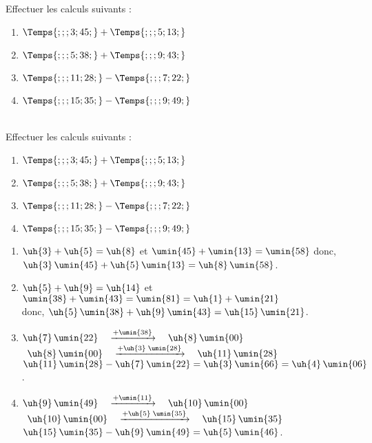 \begin{exercice}
    Effectuer les calculs suivants :
    \begin{enumerate}
       \item $\Temps{;;;3;45;} + \Temps{;;;5;13;}$
       \item $\Temps{;;;5;38;} + \Temps{;;;9;43;}$
       \item $\Temps{;;;11;28;} - \Temps{;;;7;22;}$
       \item $\Temps{;;;15;35;} - \Temps{;;;9;49;}$
    \end{enumerate}
 \end{exercice}
 
 \begin{corrige}
    \ \\ [-5mm]
    Effectuer les calculs suivants :

    \begin{enumerate}
       \item $\Temps{;;;3;45;} + \Temps{;;;5;13;}$
       \item $\Temps{;;;5;38;} + \Temps{;;;9;43;}$
       \item $\Temps{;;;11;28;} - \Temps{;;;7;22;}$
       \item $\Temps{;;;15;35;} - \Temps{;;;9;49;}$
    \end{enumerate}
    
    \smallskip
    {\red 
    \begin{enumerate}
       \item $\uh{3}+\uh{5} =\uh{8}$ et $\umin{45}+\umin{13} =\umin{58}$ donc, $\uh{3}\,\umin{45}+\uh{5}\,\umin{13} = \uh{8}\,\umin{58}$.
       \item $\uh{5}+\uh{9} =\uh{14}$ et \\
          $\umin{38}+\umin{43} =\umin{81} =\uh{1}+\umin{21}$ \\
          donc, $\uh{5}\,\umin{38}+\uh{9}\,\umin{43} = \uh{15}\,\umin{21}$.
       \item $\uh{7}\,\umin{22} \quad \xrightarrow{+\umin{38}} \quad \uh{8}\,\umin{00}$ \\
          \quad\, $\uh{8}\,\umin{00} \quad \xrightarrow{+\uh{3}\;  \umin{28}} \quad \uh{11}\,\umin{28}$ \\
          $\uh{11}\,\umin{28}-\uh{7}\,\umin{22} =\uh{3}\,\umin{66} = \uh{4}\,\umin{06}$.
       \item $\uh{9}\,\umin{49} \quad \xrightarrow{+\umin{11}} \quad \uh{10}\,\umin{00}$ \\
          \quad\, $\uh{10}\,\umin{00} \quad \xrightarrow{+\uh{5} \; \umin{35}} \quad \uh{15}\,\umin{35}$ \\   
          $\uh{15}\,\umin{35}-\uh{9}\,\umin{49} = \uh{5}\,\umin{46}$.
    \end{enumerate}
    }
 \end{corrige}